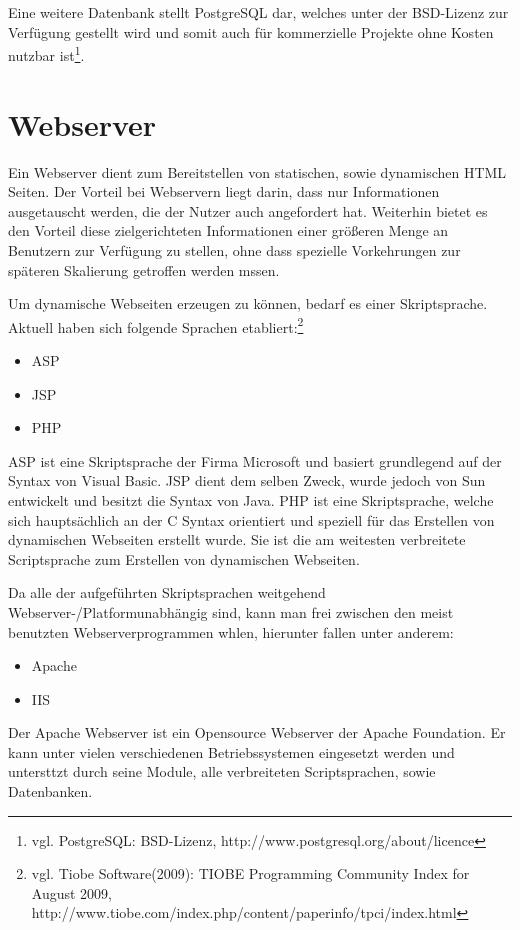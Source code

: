 Eine weitere Datenbank stellt PostgreSQL dar, welches unter der BSD-Lizenz zur Verfügung gestellt wird und somit auch für kommerzielle Projekte ohne Kosten nutzbar ist\footnote{vgl. PostgreSQL: BSD-Lizenz, http://www.postgresql.org/about/licence}.


\section{Webserver}
\label{sec:websrv}

Ein Webserver dient zum Bereitstellen von statischen, sowie dynamischen HTML Seiten.
Der Vorteil bei Webservern liegt darin, dass nur Informationen ausgetauscht werden, die der Nutzer auch angefordert hat.
Weiterhin bietet es den Vorteil diese zielgerichteten Informationen einer größeren Menge an Benutzern zur Verfügung zu stellen, ohne dass spezielle Vorkehrungen zur späteren Skalierung getroffen werden mssen.

Um dynamische Webseiten erzeugen zu können, bedarf es einer Skriptsprache.
Aktuell haben sich folgende Sprachen etabliert:\footnote{vgl. Tiobe Software(2009): TIOBE Programming Community Index for August 2009, http://www.tiobe.com/index.php/content/paperinfo/tpci/index.html}

\begin{itemize}
\item ASP
\item JSP
\item PHP
\end{itemize}

ASP ist eine Skriptsprache der Firma Microsoft und basiert grundlegend auf der Syntax von Visual Basic.
JSP dient dem selben Zweck, wurde jedoch von Sun entwickelt und besitzt die Syntax von Java.
PHP ist eine Skriptsprache, welche sich hauptsächlich an der C Syntax orientiert und speziell für das Erstellen von
dynamischen Webseiten erstellt wurde. Sie ist die am weitesten verbreitete Scriptsprache zum Erstellen von dynamischen Webseiten.

Da alle der aufgeführten Skriptsprachen weitgehend Webserver-/Platformunabhängig sind, kann man frei zwischen den meist benutzten Webserverprogrammen whlen, hierunter fallen unter anderem:


\begin{itemize}
\item Apache
\item IIS
\end{itemize}

Der Apache Webserver ist ein Opensource Webserver der Apache Foundation.
Er kann unter vielen verschiedenen Betriebssystemen eingesetzt werden und untersttzt durch seine Module, alle verbreiteten Scriptsprachen, sowie Datenbanken.

